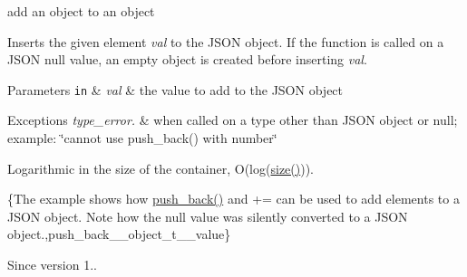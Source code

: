 add an object to an object 

Inserts the given element {\itshape val} to the J\+S\+ON object. If the function is called on a J\+S\+ON null value, an empty object is created before inserting {\itshape val}.


\begin{DoxyParams}[1]{Parameters}
\mbox{\tt in}  & {\em val} & the value to add to the J\+S\+ON object\\
\hline
\end{DoxyParams}

\begin{DoxyExceptions}{Exceptions}
{\em type\+\_\+error.} & when called on a type other than J\+S\+ON object or null; example\+: {\ttfamily \char`\"{}cannot use push\+\_\+back() with number\char`\"{}}\\
\hline
\end{DoxyExceptions}
Logarithmic in the size of the container, O(log({\ttfamily \hyperlink{classnlohmann_1_1basic__json_a33c7c8638bb0b12e6d1b69d8106dd2e0}{size()}})).

\{The example shows how {\ttfamily \hyperlink{classnlohmann_1_1basic__json_ab9e0253c92736db021840105d374c4c4}{push\+\_\+back()}} and {\ttfamily +=} can be used to add elements to a J\+S\+ON object. Note how the {\ttfamily null} value was silently converted to a J\+S\+ON object.,push\+\_\+back\+\_\+\+\_\+object\+\_\+t\+\_\+\+\_\+value\}

\begin{DoxySince}{Since}
version 1.. 
\end{DoxySince}
